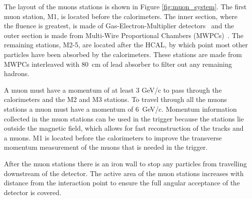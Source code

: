 The layout of the muons stations is shown in Figure \ref{fig:muon_system}. 
The first muon station, M1,  is located before the calorimeters. The inner section, where the fluence is greatest, is made of Gas-Electron-Multiplier detectors~\cite{Bencivenni:691604} and the outer section is made from Multi-Wire Proportional Chambers (MWPCs)~\cite{Botchine:2002ela}. The remaining stations, M2-5, are located after the HCAL, by which point most other particles have been absorbed by the calorimeters. These stations are made from MWPCs interleaved with 80~cm of lead absorber to filter out any remaining hadrons. %



A muon must have a momentum of at least 3 GeV/c to pass through the calorimeters and the M2 and M3 stations. To travel through all the muons stations a muon must have a momentum of 6~GeV/c. 
Momentum information collected in the muon stations can be used in the trigger because the stations lie outside the magnetic field, which allows for fast reconstruction of the tracks and a muons. M1 is located before the calorimeters to improve the transverse momentum measurement of the muons that is needed in the trigger.



After the muon stations there is an iron wall to stop any particles from travelling downstream of the detector. The active area of the muon stations increases with distance from the interaction point to ensure the full angular acceptance of the detector is covered. %

